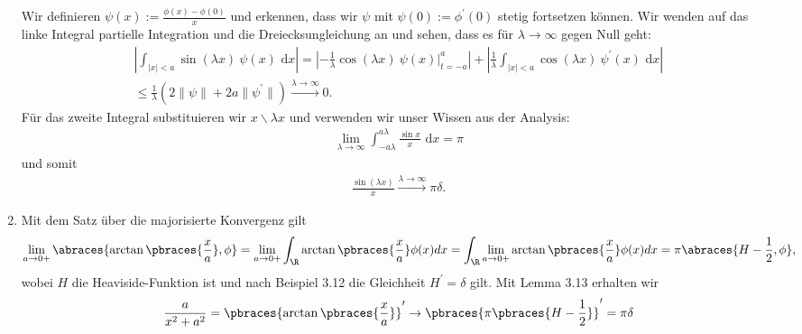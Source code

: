 \begin{solution}
\begin{enumerate}[label = (\roman*)]
Wir definieren $\psi(x) := \frac{\phi(x) - \phi(0)}{x}$ und erkennen, dass wir $\psi$ mit $\psi(0) := \phi^\prime(0)$ stetig fortsetzen können. Wir wenden auf das linke Integral partielle Integration und die Dreiecksungleichung an und sehen, dass es für $\lambda \rightarrow \infty$ gegen Null geht:
\begin{align}
\left|\int_{|x| < a} \sin(\lambda x) ~\psi(x) \text{~d}x\right|
=
\left|-\frac{1}{\lambda} \cos(\lambda x) ~ \psi(x) \Big|_{t=-a}^a \right| +
\left|\frac{1}{\lambda} \int_{|x| < a} \cos(\lambda x) ~\psi^\prime(x) \text{~d}x
\right| \\
\leq \frac{1}{\lambda} (2 \|\psi\| + 2a \|\psi^\prime\|)
\stackrel{\lambda \rightarrow \infty}{\longrightarrow} 0.
\end{align}
Für das zweite Integral substituieren wir $x \backslash \lambda x$ und verwenden wir unser Wissen aus der Analysis:
\begin{align}
    \lim_{\lambda \rightarrow \infty} \int_{-a \lambda}^{a \lambda} \frac{\sin{x}}{x} \text{~d}x = \pi
\end{align}
und somit
\begin{align}
\frac{\sin(\lambda x)}{x} \stackrel{\lambda \rightarrow \infty}{\longrightarrow} \pi\delta.
\end{align}
	\item Mit dem Satz über die majorisierte Konvergenz gilt
	\begin{align*}
	\lim_{a \to 0+}\abraces{\arctan\pbraces{\frac{x}{a}}, \phi} = \lim_{a \to 0+} \int_\R \arctan\pbraces{\frac{x}{a}} \phi(x) dx = \int_\R \lim_{a \to 0+} \arctan\pbraces{\frac{x}{a}} \phi(x) dx = \pi \abraces{H - \frac{1}{2}, \phi},
	\end{align*}
	wobei $H$ die Heaviside-Funktion ist und nach Beispiel 3.12 die Gleichheit $H^\prime = \delta$ gilt. Mit Lemma 3.13 erhalten wir
	\begin{align*}
	\frac{a}{x^2 + a^2} = \pbraces{\arctan\pbraces{\frac{x}{a}}}^\prime \to \pbraces{\pi\pbraces{H - \frac{1}{2}}}^\prime = \pi \delta
	\end{align*}
\end{enumerate}

\end{solution}

